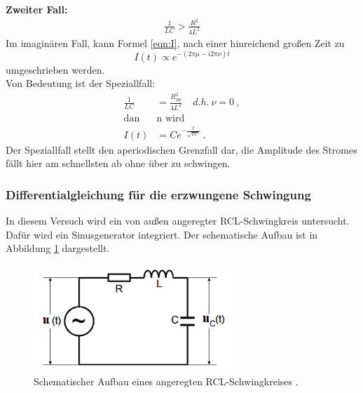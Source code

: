 \newline
\newline
\textbf{Zweiter Fall:}
\begin{align*}
	\frac{1}{LC} > \frac{R^2}{4L^2}
\end{align*}
Im imaginären Fall, kann Formel \ref{eqn:I}, nach einer hinreichend großen Zeit zu
\begin{equation}
	I(t) \propto e^{-(2 \pi \mu - i2 \pi \nu)t}
\end{equation}
umgeschrieben werden. \\
Von Bedeutung ist der Speziallfall:
\begin{align}
	\frac{1}{LC} & = \frac{R_\text{ap}^2}{4L^2} \ \ \ \ \ d.h. \ \nu = 0 \ , \\
	\label{eqn:Rap}
	\text{dan}&\text{n wird} \\
	I(t) & = C e^{- \frac{t}{\sqrt{LC}}} \ .
\end{align}
Der Speziallfall stellt den aperiodischen Grenzfall dar, die Amplitude des Stromes fällt hier am schnellsten ab ohne über zu schwingen.

\subsubsection{Differentialgleichung für die erzwungene Schwingung}
In diesem Versuch wird ein von außen angeregter RCL-Schwingkreis untersucht. Dafür wird ein Sinusgenerator integriert. Der schematische Aufbau ist in Abbildung \ref{fig:aRCL} dargestellt.

\begin{figure}[H]
	\centering
	\includegraphics[height=4cm]{picture/Theorie2.PNG}
	\caption{Schematischer Aufbau eines angeregten RCL-Schwingkreises \cite[289]{sample}.}
	\label{fig:aRCL}
\end{figure}

